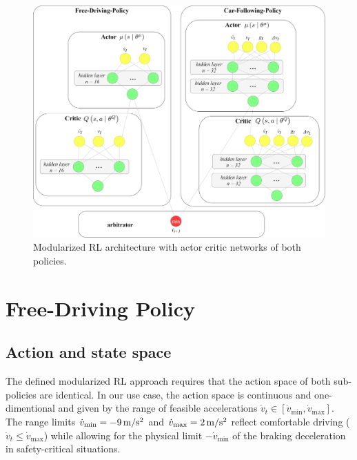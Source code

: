 \documentclass[review]{elsarticle}
\providecommand{\sub}[1]{_{\mathrm{#1}}}  %
\providecommand{\3}{{\ss}}
\begin{document}
	\begin{figure}
		\centering
		\includegraphics[width=12cm]{images/MRL_small}
		\caption{Modularized RL architecture with actor critic networks of both policies.} 
		\label{fig:MRL}
	\end{figure}
	
	
	
	
	
	
	\section{Free-Driving Policy}
	\label{sec:FreeDrivingPolicy}
	\subsection{Action and state space}
	\label{stateSpaceFree}
	The defined modularized RL approach requires that the action space of
	both sub-policies are identical. In our use case, the action space is
	continuous and one-dimentional and given by the range of feasible accelerations
	$\dot{v}_t \in [\dot{v}\sub{min}, \dot{v}\sub{max}]$. The range limits
	$\dot{v}\sub{min}= \unit[-9]{m/s^2}$ and  $\dot{v}\sub{max} =\unit[2]{m/s^2}$
	reflect comfortable driving ($\dot{v}_t \le \dot{v}\sub{max}$) while
	allowing for the physical limit $-\dot{v}\sub{min}$ of the braking
	deceleration in safety-critical
	situations.
	
\end{document}
